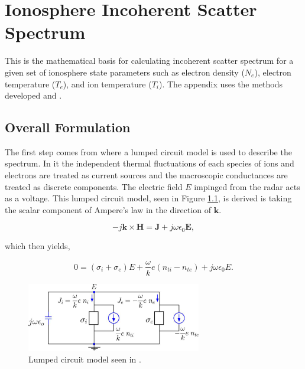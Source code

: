 \chapter{Ionosphere Incoherent Scatter Spectrum}
\label{appendix1}
\thispagestyle{myheadings}
\graphicspath{{Appendix/Figures/}}


This is the mathematical basis for calculating incoherent scatter spectrum for a given set of ionosphere state parameters such as electron density ($N_e$), electron temperature ($T_e$),  and ion temperature ($T_i$). The appendix uses the methods developed \citet{kudeki:milla:1} and \citet{Kudeki:2006kx}.

\section*{Overall Formulation}
The first step comes from \citep{kudeki:milla:1} where a lumped circuit model is used to describe the spectrum. In it the independent thermal fluctuations of each species of ions and electrons are treated as current sources and the macroscopic conductances are treated as discrete components. The electric field $E$ impinged from the radar acts as a voltage. This lumped circuit model, seen in Figure \ref{fig:circuit}, is derived is taking the scalar component of Ampere's law in the direction of $\mathbf{k}$.  

\begin{equation}
\label{eq:ampere}
-j\mathbf{k} \times \mathbf{H} = \mathbf{J} +j\omega \epsilon_0 \mathbf{E},
\end{equation}

\noindent which then yields,

\begin{equation} 
\label{eq:ampscaler}
0=(\sigma_i +\sigma_e)E +\frac{\omega}{k}e(n_{ti}-n_{te}) +j\omega \epsilon_0 E.
\end{equation}

\begin{figure}[!h]
\centering
\includegraphics[width=3.0in]{circuit}
\caption{Lumped circuit model seen in  \citep{kudeki:milla:1}.}
\label{fig:circuit}
\end{figure}

